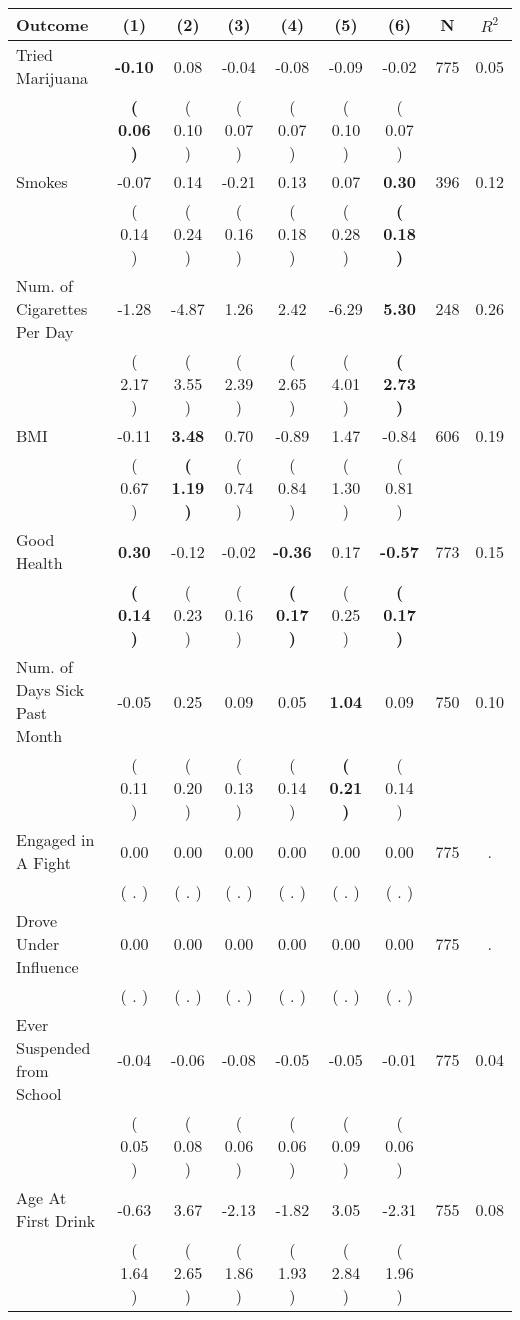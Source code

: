 \begin{tabular}{lcccccccc}
\toprule
 \textbf{Outcome} & \textbf{(1)} & \textbf{(2)} & \textbf{(3)} & \textbf{(4)} & \textbf{(5)} & \textbf{(6)} & \textbf{N} & \textbf{$ R^2$} \\
\midrule
Tried Marijuana & \textbf{    -0.10} &      0.08 &     -0.04 &     -0.08 &     -0.09 &     -0.02 & 775 &       0.05 \\ 
 & \textbf{(     0.06 )} & (     0.10 ) & (     0.07 ) & (     0.07 ) & (     0.10 ) & (     0.07 ) & \\
Smokes &     -0.07 &      0.14 &     -0.21 &      0.13 &      0.07 & \textbf{     0.30} & 396 &       0.12 \\ 
 & (     0.14 ) & (     0.24 ) & (     0.16 ) & (     0.18 ) & (     0.28 ) & \textbf{(     0.18 )} & \\
Num. of Cigarettes Per Day &     -1.28 &     -4.87 &      1.26 &      2.42 &     -6.29 & \textbf{     5.30} & 248 &       0.26 \\ 
 & (     2.17 ) & (     3.55 ) & (     2.39 ) & (     2.65 ) & (     4.01 ) & \textbf{(     2.73 )} & \\
BMI &     -0.11 & \textbf{     3.48} &      0.70 &     -0.89 &      1.47 &     -0.84 & 606 &       0.19 \\ 
 & (     0.67 ) & \textbf{(     1.19 )} & (     0.74 ) & (     0.84 ) & (     1.30 ) & (     0.81 ) & \\
Good Health & \textbf{     0.30} &     -0.12 &     -0.02 & \textbf{    -0.36} &      0.17 & \textbf{    -0.57} & 773 &       0.15 \\ 
 & \textbf{(     0.14 )} & (     0.23 ) & (     0.16 ) & \textbf{(     0.17 )} & (     0.25 ) & \textbf{(     0.17 )} & \\
Num. of Days Sick Past Month &     -0.05 &      0.25 &      0.09 &      0.05 & \textbf{     1.04} &      0.09 & 750 &       0.10 \\ 
 & (     0.11 ) & (     0.20 ) & (     0.13 ) & (     0.14 ) & \textbf{(     0.21 )} & (     0.14 ) & \\
Engaged in A Fight &      0.00 &      0.00 &      0.00 &      0.00 &      0.00 &      0.00 & 775 &          . \\ 
 & (        . ) & (        . ) & (        . ) & (        . ) & (        . ) & (        . ) & \\
Drove Under Influence &      0.00 &      0.00 &      0.00 &      0.00 &      0.00 &      0.00 & 775 &          . \\ 
 & (        . ) & (        . ) & (        . ) & (        . ) & (        . ) & (        . ) & \\
Ever Suspended from School &     -0.04 &     -0.06 &     -0.08 &     -0.05 &     -0.05 &     -0.01 & 775 &       0.04 \\ 
 & (     0.05 ) & (     0.08 ) & (     0.06 ) & (     0.06 ) & (     0.09 ) & (     0.06 ) & \\
Age At First Drink &     -0.63 &      3.67 &     -2.13 &     -1.82 &      3.05 &     -2.31 & 755 &       0.08 \\ 
 & (     1.64 ) & (     2.65 ) & (     1.86 ) & (     1.93 ) & (     2.84 ) & (     1.96 ) & \\
\bottomrule
\end{tabular}
